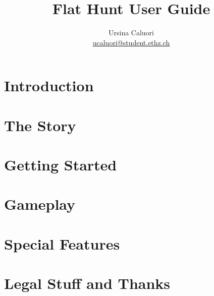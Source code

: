 \documentclass[a4paper,titlepage,12pt]{article}
\title{\textbf{Flat Hunt User Guide}}
\author{Ursina Caluori\\ \href{mailto: ucaluori@student.ethz.ch}{ucaluori@student.ethz.ch}}
\begin{document}
  \maketitle
  
  \tableofcontents
  
  \pagebreak

  
 

  \section{Introduction}
    
  \section{The Story}
    
  \section{Getting Started}
    
  \section{Gameplay}
     
  \section{Special Features}
    
  \section{Legal Stuff and Thanks}
    
    
    \hyperref[ugref]{}    
    
    
\end{document}
